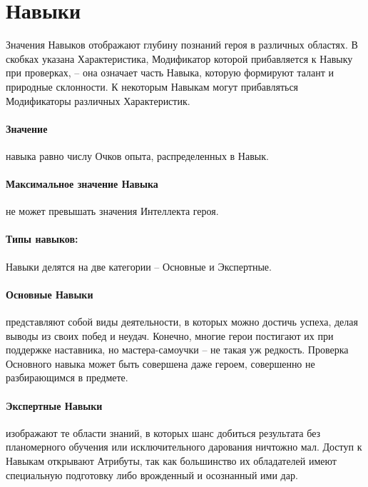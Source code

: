 \section{Навыки}
Значения Навыков отображают глубину познаний героя в различных областях. В скобках указана Характеристика, Модификатор которой прибавляется к Навыку при проверках, – она означает часть Навыка, которую формируют талант и природные склонности. К некоторым Навыкам могут прибавляться Модификаторы различных Характеристик.
\paragraph{Значение} навыка равно числу Очков опыта, распределенных в Навык.
\paragraph{Максимальное значение Навыка} не может превышать значения Интеллекта героя.
\paragraph{Типы навыков:} Навыки делятся на две категории – Основные и Экспертные.
\paragraph{Основные Навыки} представляют собой виды деятельности, в которых можно достичь успеха, делая выводы из своих побед и неудач. Конечно, многие герои постигают их при поддержке наставника, но мастера-самоучки – не такая уж редкость.
\newline Проверка Основного навыка может быть совершена даже героем, совершенно не разбирающимся в предмете.
\paragraph{Экспертные Навыки} изображают те области знаний, в которых шанс добиться результата без планомерного обучения или исключительного дарования ничтожно мал. Доступ к Навыкам открывают Атрибуты, так как большинство их обладателей имеют специальную подготовку либо врожденный и осознанный ими дар.

